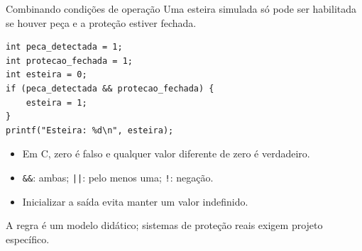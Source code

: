 \begin{frame}[fragile]{Combinando condições de operação}
Uma esteira simulada só pode ser habilitada se houver peça e a proteção estiver fechada.
\begin{lstlisting}
int peca_detectada = 1;
int protecao_fechada = 1;
int esteira = 0;
if (peca_detectada && protecao_fechada) {
    esteira = 1;
}
printf("Esteira: %d\n", esteira);
\end{lstlisting}
\begin{itemize}
\item Em C, zero é falso e qualquer valor diferente de zero é verdadeiro.
\item \texttt{\&\&}: ambas; \texttt{||}: pelo menos uma; \texttt{!}: negação.
\item Inicializar a saída evita manter um valor indefinido.
\end{itemize}
\small A regra é um modelo didático; sistemas de proteção reais exigem projeto específico.
\end{frame}
